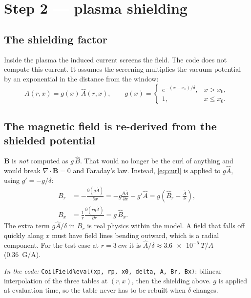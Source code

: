 \documentclass[11pt,a4paper]{article}
\newcommand{\Ahat}{\hat{A}}
\newcommand{\Bhat}{\hat{B}}
\newcommand{\code}[1]{\texttt{#1}}
\newcommand{\incode}[1]{\par\smallskip\noindent\textit{In the code:} #1\par\smallskip}
\begin{document}
\section{Step 2 --- plasma shielding}

\subsection{The shielding factor}

Inside the plasma the induced current screens the field. The code does not
compute this current. It assumes the screening multiplies the vacuum
potential by an exponential in the distance from the window:
\begin{equation}
  A(r,x) = g(x)\,\Ahat(r,x),\qquad
  g(x) = \begin{cases} e^{-(x-x_0)/\delta}, & x > x_0,\\ 1, & x\le x_0.\end{cases}
\end{equation}

\subsection{The magnetic field is re-derived from the shielded potential}

$\mathbf B$ is \emph{not} computed as $g\,\Bhat$. That would no longer be
the curl of anything and would break $\nabla\cdot\mathbf B = 0$ and
Faraday's law. Instead, \eqref{eq:curl} is applied to $g\Ahat$, using
$g' = -g/\delta$:
\begin{align}
  B_r &= -\frac{\partial (g\Ahat)}{\partial x}
       = -g\frac{\partial\Ahat}{\partial x} - g'\Ahat
       = g\left(\Bhat_r + \frac{\Ahat}{\delta}\right), \\
  B_x &= \frac{1}{r}\frac{\partial (r g\Ahat)}{\partial r} = g\,\Bhat_x .
\end{align}
The extra term $g\Ahat/\delta$ in $B_r$ is real physics within the model. A
field that falls off quickly along $x$ must have field lines bending
outward, which is a radial component. For the test case at $r=\SI{3}{cm}$
it is $\Ahat/\delta \approx \SI{3.6e-5}{T/A}$ (\SI{0.36}{G/A}).

\incode{\code{CoilField\%eval(xp, rp, x0, delta, A, Br, Bx)}: bilinear
interpolation of the three tables at $(r,x)$, then the shielding above.
$g$ is applied at evaluation time, so the table never has to be rebuilt
when $\delta$ changes.}
\end{document}
